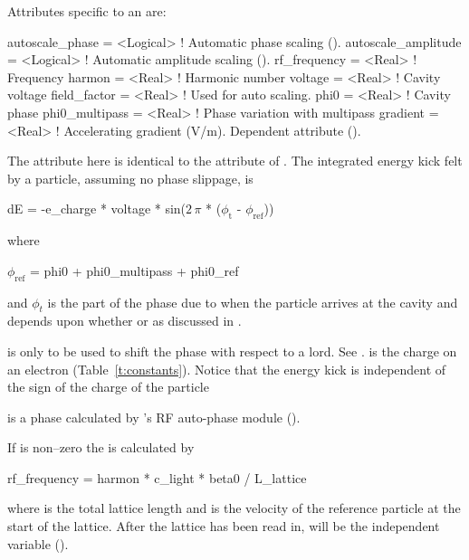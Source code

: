 {
Attributes specific to an  are:
\begin{example}
  autoscale_phase     = <Logical>  ! Automatic phase scaling ().
  autoscale_amplitude = <Logical>  ! Automatic amplitude scaling ().
  rf_frequency   = <Real>    ! Frequency
  harmon         = <Real>    ! Harmonic number
  voltage        = <Real>    ! Cavity voltage
  field_factor   = <Real>    ! Used for auto scaling.
  phi0           = <Real>    ! Cavity phase
  phi0_multipass = <Real>    ! Phase variation with multipass
  gradient       = <Real>    ! Accelerating gradient (V/m). Dependent attribute ().
\end{example}

The  attribute here is identical to the  attribute of
\mad. The integrated energy kick felt by a particle, assuming no phase slippage, is 
\begin{example}
  dE = -e_charge * voltage * sin(\(2\,\pi\) * (\(\phi_\text{t}\) - \(\phi_\text{ref}\)))
\end{example}
where
\begin{example}
  \(\phi_\text{ref}\) = phi0 + phi0_multipass + phi0_ref
\end{example}
and $\phi_t$ is the part of the phase due to when the particle arrives
at the cavity and depends upon whether  or 
 as discussed in .

 is only to be used to shift the phase with respect
to a  lord. See .  is the
charge on an electron (Table~\ref{t:constants}). Notice that the
energy kick is independent of the sign of the charge of the particle

 is a phase calculated by \bmad's RF auto-phase module
().

If  is non--zero the  is calculated by
\begin{example}
  rf_frequency = harmon * c_light * beta0 / L_lattice 
\end{example}
where  is the total lattice length and  is the
velocity of the reference particle at the start of the lattice. After
the lattice has been read in,  will be the
independent variable ().

}
